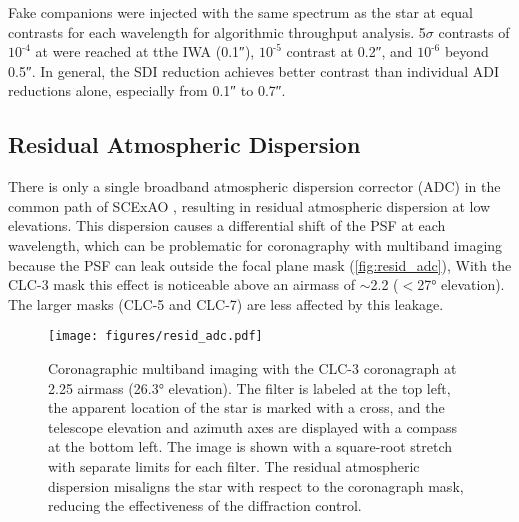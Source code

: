Fake companions were injected with the same spectrum as the star at equal contrasts for each wavelength for algorithmic throughput analysis. 5$\sigma$ contrasts of $10^{\text{-}4}$ at were reached at tthe IWA (\ang{;;0.1}), $10^{\text{-}5}$ contrast at \ang{;;0.2}, and $10^{\text{-}6}$ beyond \ang{;;0.5}. In general, the SDI reduction achieves better contrast than individual ADI reductions alone, especially from \ang{;;0.1} to \ang{;;0.7}.

\subsection{Residual Atmospheric Dispersion}

There is only a single broadband atmospheric dispersion corrector (ADC) in the common path of SCExAO \citep{egner_atmospheric_2010}, resulting in residual atmospheric dispersion at low elevations. This dispersion causes a differential shift of the PSF at each wavelength, which can be problematic for coronagraphy with multiband imaging because the PSF can leak outside the focal plane mask (\autoref{fig:resid_adc}), With the CLC-3 mask this effect is noticeable above an airmass of $\sim$\num{2.2} ($<$\ang{27} elevation). The larger masks (CLC-5 and CLC-7) are less affected by this leakage.

\begin{figure}
    \centering
    \texttt{[image: figures/resid\_adc.pdf]}
    \caption{Coronagraphic multiband imaging with the CLC-3 coronagraph at 2.25 airmass (\ang{26.3} elevation). The filter is labeled at the top left, the apparent location of the star is marked with a cross, and the telescope elevation and azimuth axes are displayed with a compass at the bottom left. The image is shown with a square-root stretch with separate limits for each filter. The residual atmospheric dispersion misaligns the star with respect to the coronagraph mask, reducing the effectiveness of the diffraction control.\label{fig:resid_adc}}
\end{figure}
